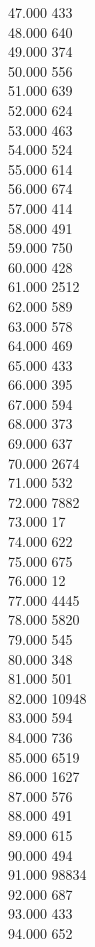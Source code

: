 { 47.000	433 \\
 48.000	640 \\
 49.000	374 \\
 50.000	556 \\
 51.000	639 \\
 52.000	624 \\
 53.000	463 \\
 54.000	524 \\
 55.000	614 \\
 56.000	674 \\
 57.000	414 \\
 58.000	491 \\
 59.000	750 \\
 60.000	428 \\
 61.000	2512 \\
 62.000	589 \\
 63.000	578 \\
 64.000	469 \\
 65.000	433 \\
 66.000	395 \\
 67.000	594 \\
 68.000	373 \\
 69.000	637 \\
 70.000	2674 \\
 71.000	532 \\
 72.000	7882 \\
 73.000	17 \\
 74.000	622 \\
 75.000	675 \\
 76.000	12 \\
 77.000	4445 \\
 78.000	5820 \\
 79.000	545 \\
 80.000	348 \\
 81.000	501 \\
 82.000	10948 \\
 83.000	594 \\
 84.000	736 \\
 85.000	6519 \\
 86.000	1627 \\
 87.000	576 \\
 88.000	491 \\
 89.000	615 \\
 90.000	494 \\
 91.000	98834 \\
 92.000	687 \\
 93.000	433 \\
 94.000	652 \\
}
